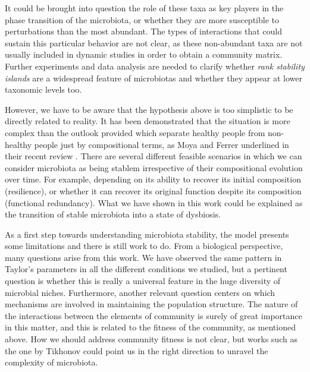 It could be brought into question the role of these taxa as key players in the phase transition of the microbiota, or whether they are more susceptible to perturbations than the most abundant. The types of interactions that could sustain this particular behavior are not clear, as these non-abundant taxa are not usually included in dynamic studies in order to obtain a community matrix. Further experiments and data analysis are needed to clarify whether \emph{rank stability islands} are a widespread feature of microbiotas and whether they appear at lower taxonomic levels too.

However, we have to be aware that the hypothesis above is too simplistic to be directly related to reality. It has been demonstrated that the situation is more complex than the outlook provided which separate healthy people from non-healthy people just by compositional terms, as Moya and Ferrer underlined in their recent review \cite{Moya_trends}. There are several different feasible scenarios in which we can consider microbiota as being stablem irrespective of their compositional evolution over time. For example, depending on its ability to recover its initial composition (resilience), or whether it can recover its original function despite its composition (functional redundancy). What we have shown in this work could be explained as the transition of stable microbiota into a state of dysbiosis.  

As a first step towards understanding microbiota stability, the model presents some limitations and there is still work to do. From a biological perspective, many questions arise from this work. We have observed the same pattern in Taylor's parameters in all the different conditions we studied, but a pertinent question is whether this is really a universal feature in the huge diversity of microbial niches. Furthermore, another relevant question centers on which mechanisms are involved in maintaining the population structure. The nature of the interactions between the elements of community is surely of great importance in this matter, and this is related to the fitness of the community, as mentioned above. How we should address community fitness is not clear, but works such as the one by Tikhonov \cite{tikhonov} could point us in the right direction to unravel the complexity of microbiota.